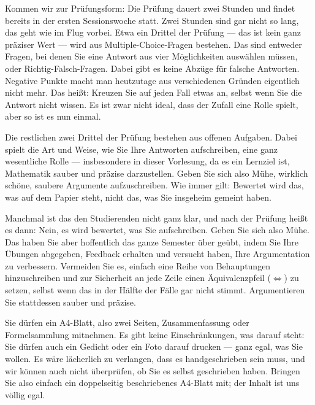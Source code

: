 \begin{spoken-clean}[01:20:27 - 01:22:57]
Kommen wir zur Prüfungsform: Die Prüfung dauert zwei Stunden und findet bereits in der ersten Sessionswoche statt. Zwei Stunden sind gar nicht so lang, das geht wie im Flug vorbei. Etwa ein Drittel der Prüfung --- das ist kein ganz präziser Wert --- wird aus Multiple-Choice-Fragen bestehen. Das sind entweder Fragen, bei denen Sie eine Antwort aus vier Möglichkeiten auswählen müssen, oder Richtig-Falsch-Fragen. Dabei gibt es keine Abzüge für falsche Antworten. Negative Punkte macht man heutzutage aus verschiedenen Gründen eigentlich nicht mehr. Das heißt: Kreuzen Sie auf jeden Fall etwas an, selbst wenn Sie die Antwort nicht wissen. Es ist zwar nicht ideal, dass der Zufall eine Rolle spielt, aber so ist es nun einmal.

Die restlichen zwei Drittel der Prüfung bestehen aus offenen Aufgaben. Dabei spielt die Art und Weise, wie Sie Ihre Antworten aufschreiben, eine ganz wesentliche Rolle --- insbesondere in dieser Vorlesung, da es ein Lernziel ist, Mathematik sauber und präzise darzustellen. Geben Sie sich also Mühe, wirklich schöne, saubere Argumente aufzuschreiben. Wie immer gilt: Bewertet wird das, was auf dem Papier steht, nicht das, was Sie insgeheim gemeint haben.

Manchmal ist das den Studierenden nicht ganz klar, und nach der Prüfung heißt es dann:  Nein, es wird bewertet, was Sie aufschreiben. Geben Sie sich also Mühe. Das haben Sie aber hoffentlich das ganze Semester über geübt, indem Sie Ihre Übungen abgegeben, Feedback erhalten und versucht haben, Ihre Argumentation zu verbessern. Vermeiden Sie es, einfach eine Reihe von Behauptungen hinzuschreiben und zur Sicherheit an jede Zeile einen Äquivalenzpfeil ($\iff$) zu setzen, selbst wenn das in der Hälfte der Fälle gar nicht stimmt. Argumentieren Sie stattdessen sauber und präzise.
\end{spoken-clean}

\begin{spoken-clean}[01:22:57 - 01:23:49]
Sie dürfen ein A4-Blatt, also zwei Seiten, Zusammenfassung oder Formelsammlung mitnehmen. Es gibt keine Einschränkungen, was darauf steht: Sie dürfen auch ein Gedicht oder ein Foto darauf drucken --- ganz egal, was Sie wollen. Es wäre lächerlich zu verlangen, dass es handgeschrieben sein muss, und wir können auch nicht überprüfen, ob Sie es selbst geschrieben haben. Bringen Sie also einfach ein doppelseitig beschriebenes A4-Blatt mit; der Inhalt ist uns völlig egal.
\end{spoken-clean}


